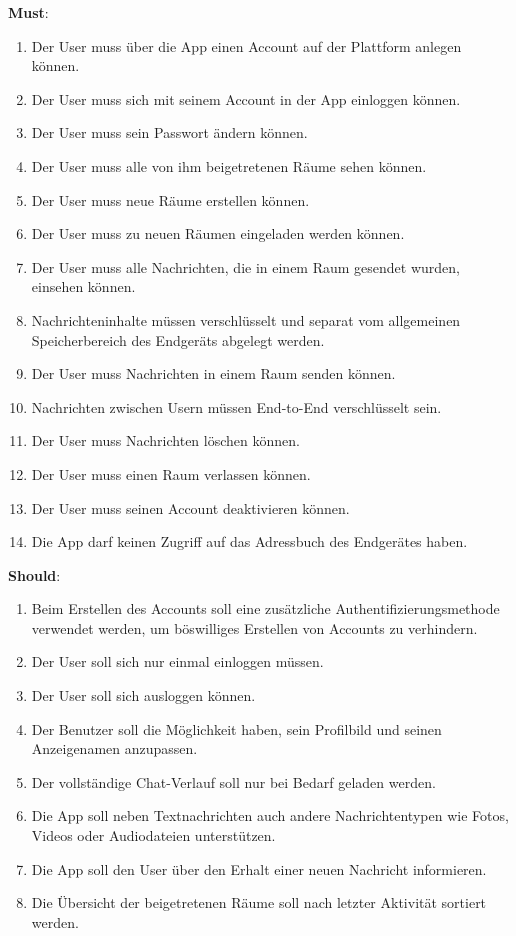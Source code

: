     \textbf{Must}:
    \begin{enumerate}[label={\roman*.}, leftmargin=2.5cm]
        \item Der User muss über die App einen Account auf der Plattform anlegen können.
        \item Der User muss sich mit seinem Account in der App einloggen können.
        \item Der User muss sein Passwort ändern können.
        \item Der User muss alle von ihm beigetretenen Räume sehen können.
        \item Der User muss neue Räume erstellen können.
        \item Der User muss zu neuen Räumen eingeladen werden können.
        \item Der User muss alle Nachrichten, die in einem Raum gesendet wurden, einsehen können.
        \item Nachrichteninhalte müssen verschlüsselt und separat vom allgemeinen Speicherbereich des Endgeräts abgelegt werden.
        \item Der User muss Nachrichten in einem Raum senden können.
        \item Nachrichten zwischen Usern müssen End-to-End verschlüsselt sein.
        \item Der User muss Nachrichten löschen können.
        \item Der User muss einen Raum verlassen können.
        \item Der User muss seinen Account deaktivieren können.
        \item Die App darf keinen Zugriff auf das Adressbuch des Endgerätes haben.
    \end{enumerate}

    \textbf{Should}:
    \begin{enumerate}[label={\roman*.}, leftmargin=2.5cm]
        \item Beim Erstellen des Accounts soll eine zusätzliche Authentifizierungsmethode verwendet werden, um böswilliges Erstellen von Accounts zu verhindern.
        \item Der User soll sich nur einmal einloggen müssen.
        \item Der User soll sich ausloggen können.
        \item Der Benutzer soll die Möglichkeit haben, sein Profilbild und seinen Anzeigenamen anzupassen.
        \item Der vollständige Chat-Verlauf soll nur bei Bedarf geladen werden.
        \item Die App soll neben Textnachrichten auch andere Nachrichtentypen wie Fotos, Videos oder Audiodateien unterstützen.
        \item Die App soll den User über den Erhalt einer neuen Nachricht informieren.
        \item Die Übersicht der beigetretenen Räume soll nach letzter Aktivität sortiert werden.
    \end{enumerate}


